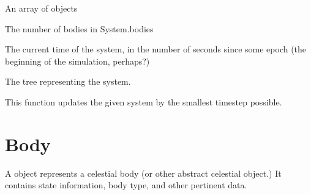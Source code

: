 \documentclass[letterpaper,10pt,english]{sphinxmanual}
\begin{document}
An array of  objects

\begin{fulllineitems}
\label{\detokenize{system:c.System.count}}
\end{fulllineitems}


The number of bodies in System.bodies

\begin{fulllineitems}
\label{\detokenize{system:c.time}}
\end{fulllineitems}


The current time of the system, in the number of seconds since some epoch (the beginning of the simulation, perhaps?)

\begin{fulllineitems}
\label{\detokenize{system:c.tree}}
\end{fulllineitems}


The tree representing the system.

\begin{fulllineitems}
\label{\detokenize{system:c.update_system}}
\end{fulllineitems}


This function updates the given system by the smallest timestep possible.


\chapter{Body}
\label{\detokenize{body:body}}\label{\detokenize{body::doc}}

\begin{fulllineitems}
\label{\detokenize{body:c.Body}}
\end{fulllineitems}


A  object represents a celestial body (or other abstract celestial object.) It contains state information, body type, and other pertinent data.
\end{document}
